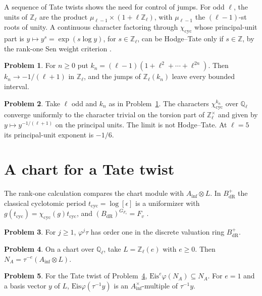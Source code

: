 \documentclass[reqno]{amsart}
\theoremstyle{definition}
\newtheorem{problem}{Problem}[section]
\theoremstyle{plain}
\theoremstyle{remark}
\newcommand{\Z}{\mathbb Z}
\newcommand{\Q}{\mathbb Q}
\newcommand{\Bdr}{B_{\mathrm{dR}}}
\newcommand{\Ainf}{A_{\mathrm{inf}}}
\newcommand{\Eis}{\mathrm{Eis}}
\begin{document}
A sequence of Tate twists shows the need for control of jumps. For odd \(\ell\), the units of \(\Z_\ell\) are the product
\(\mu_{\ell-1}\times(1+\ell\Z_\ell)\), with \(\mu_{\ell-1}\) the
\((\ell-1)\)-st roots of unity. A continuous
character factoring through \(\chi_{\mathrm{cyc}}\) whose principal-unit
part is \(y\mapsto y^s=\exp(s\log y)\), for \(s\in\Z_\ell\), can be
Hodge--Tate only if \(s\in\Z\), by the rank-one Sen weight criterion \cite{Sen}.

\begin{problem}\label{pr:limit-exponent}
For \(n\ge 0\) put \(k_n=(\ell-1)(1+\ell^2+\cdots+\ell^{2n})\).
Then \(k_n\to -1/(\ell+1)\) in \(\Z_\ell\), and the jumps of
\(\Z_\ell(k_n)\) leave every bounded interval.
\end{problem}

\begin{problem}\label{pr:limit-character}
Take \(\ell\) odd and \(k_n\) as in Problem~\ref{pr:limit-exponent}.
The characters \(\chi_{\mathrm{cyc}}^{k_n}\) over \(\Q_\ell\) converge
uniformly to the character trivial on the torsion part of \(\Z_\ell^\times\)
and given by \(y\mapsto y^{-1/(\ell+1)}\) on the principal units.
The limit is not Hodge--Tate. At \(\ell=5\) its principal-unit exponent is
\(-1/6\).
\end{problem}

\section{A chart for a Tate twist}\label{sec:tate-chart}

The rank-one calculation compares the chart module with \(\Ainf\otimes L\).
In \(\Bdr^+\) the classical cyclotomic period \(t_{\mathrm{cyc}}=\log[\epsilon]\)
is a uniformizer with \(g(t_{\mathrm{cyc}})=\chi_{\mathrm{cyc}}(g)t_{\mathrm{cyc}}\), and
\((\Bdr)^{G_{F_v}}=F_v\) \cite{Fo,Co}.

\begin{problem}\label{pr:chart-period}
For \(j\ge 1\), \(\varphi^j\tau\) has order one in the discrete
valuation ring \(\Bdr^+\).
\end{problem}

\begin{problem}\label{pr:chart-tate}
On a chart over \(\Q_\ell\), take \(L=\Z_\ell(e)\) with \(e\ge 0\).
Then \(N_A=\tau^{-e}(\Ainf\otimes L)\).
\end{problem}

\begin{problem}\label{pr:chart-frob}
For the Tate twist of Problem~\ref{pr:chart-tate},
\(\Eis^e\varphi(N_A)\subseteq N_A\).
For \(e=1\) and a basis vector \(y\) of \(L\),
\(\Eis\varphi(\tau^{-1}y)\) is an \(\Ainf^\times\)-multiple of \(\tau^{-1}y\).
\end{problem}
\end{document}
